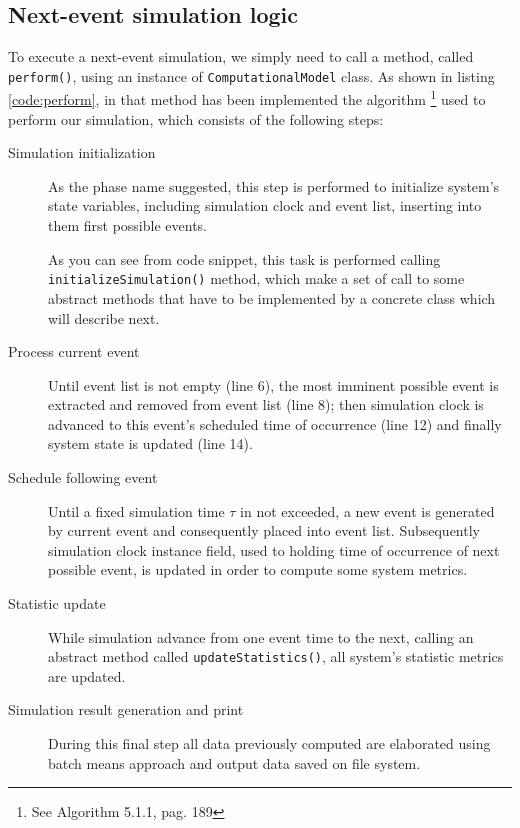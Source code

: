 \documentclass[10pt,a4paper]{article}
\begin{document}
\subsection{Next-event simulation logic}

To execute a next-event simulation, we simply need to call a method, called \texttt{perform()}, using an instance of \texttt{ComputationalModel} class.
As shown in listing \ref{code:perform}, in that method has been implemented the algorithm \footnote{See Algorithm 5.1.1, pag. 189} used to perform our simulation, which consists of the following steps: 

\begin{description}
\item[Simulation initialization] As the phase name suggested, this step is performed to initialize system's state variables, including simulation clock and event list, inserting into them first possible events.

As you can see from code snippet, this task is performed calling \texttt{initialize\-Simulation()} method, which make a set of call to some abstract methods that have to be implemented by a concrete class which will describe next. 

\item[Process current event] Until event list is not empty (line 6), the most imminent possible event is extracted and removed from event list (line 8); then simulation clock is advanced to this event's scheduled time of occurrence (line 12) and finally system state is updated (line 14). 

\item[Schedule following event] Until a fixed simulation time $\tau$ in not exceeded, a new event is generated by current event and consequently placed into event list. Subsequently simulation clock instance field, used to holding time of occurrence of next possible event, is updated in order to compute some system metrics.

\item[Statistic update] While simulation advance from one event time to the next, calling an abstract method called \texttt{updateStatistics()}, all system's statistic metrics are updated.

\item[Simulation result generation and print] During this final step all data previously computed are elaborated using batch means approach and output data saved on file system.
\end{description}
\end{document}
